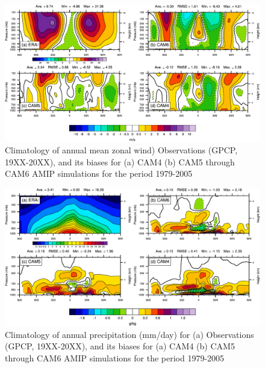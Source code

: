 \clearpage
\begin{figure}[t]
    \includegraphics[width=1.\textwidth,angle=0.]{./figs/f_U_2D_ANN_CAM456.pdf}
  \caption{Climatology of annual mean zonal wind) Observations (GPCP, 19XX-20XX), and its biases for (a) CAM4 (b) CAM5  through CAM6 AMIP simulations for the period 1979-2005} 
\label{f_U_2D_ANN_CAM456}
\end{figure} 



\clearpage
\begin{figure}[t]
  \begin{center}
    \includegraphics[width=1.\textwidth,angle=0.]{./figs/f_MERRA_Q_latp_diff_ANN.pdf}
  \end{center}
  \caption{Climatology of annual precipitation (mm/day) for (a) Observations (GPCP, 19XX-20XX), and its biases for (a) CAM4 (b) CAM5  through CAM6 AMIP simulations for the period 1979-2005} 
\label{MERRA_Q_latp_diff_ANN}
\end{figure} 



